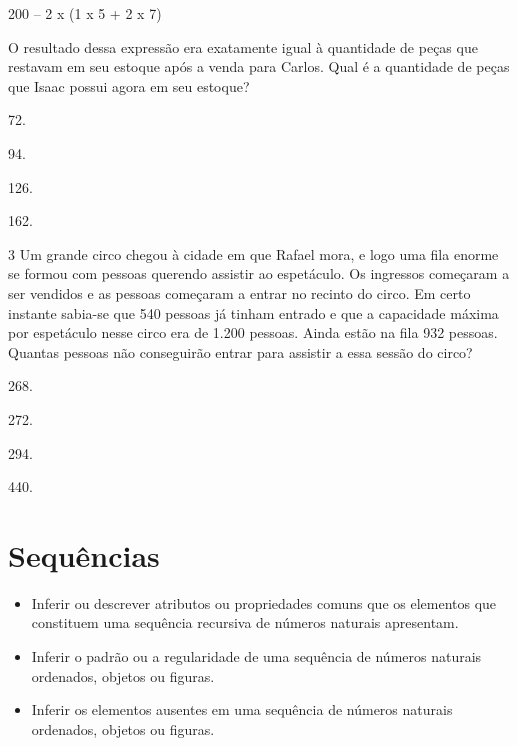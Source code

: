 \begin{myquote}
200 -- 2 x (1 x 5 + 2 x 7)
\end{myquote}

O resultado dessa expressão era exatamente igual à quantidade de peças
que restavam em seu estoque após a venda para Carlos. Qual é a
quantidade de peças que Isaac possui agora em seu estoque?

\begin{multicols}{2}
\begin{escolha}
\item
  72.
\item
  94.
\item
  126.
\item
  162.
\end{escolha}
\end{multicols}


\num{3} Um grande circo chegou à cidade em que Rafael mora, e logo uma fila
enorme se formou com pessoas querendo assistir ao espetáculo. Os
ingressos começaram a ser vendidos e as pessoas começaram a entrar no
recinto do circo. Em certo instante sabia-se que 540 pessoas já tinham
entrado e que a capacidade máxima por espetáculo nesse circo era de 1.200 pessoas. Ainda estão na fila 932 pessoas. Quantas pessoas não
conseguirão entrar para assistir a essa sessão do circo?

\begin{multicols}{2}
\begin{escolha}
\item
  268.
\item
  272.
\item
  294.
\item
  440.
\end{escolha}
\end{multicols}


\chapter{Sequências}


\begin{itemize}
\item Inferir ou descrever atributos ou propriedades comuns que os elementos
que constituem uma sequência recursiva de números naturais apresentam.

\item Inferir o padrão ou a regularidade de uma sequência de números
naturais ordenados, objetos ou figuras.

\item Inferir os elementos ausentes em uma sequência de números naturais
ordenados, objetos ou figuras.
\end{itemize}

